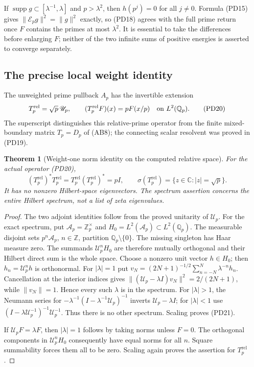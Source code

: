 \documentclass[11pt,a4paper]{article}
\newtheorem{theorem}{Theorem}[section]
\theoremstyle{definition}\newtheorem{definition}[theorem]{Definition}
\newcommand{\Z}{\mathbb Z}\newcommand{\Q}{\mathbb Q}
\newcommand{\C}{\mathbb C}\newcommand{\R}{\mathbb R}
\newcommand{\supp}{\operatorname{supp}}\newcommand{\tr}{\operatorname{tr}}
\begin{document}
If $\supp g\subset[\lambda^{-1},\lambda]$ and $p>\lambda^2$,
then $h(p^j)=0$ for all $j\ne0$. Formula (PD15) gives
$\|\mathcal E_pg\|^2=\|g\|^2$ exactly, so (PD18) agrees with the
full prime return once $F$ contains the primes at most $\lambda^2$.
It is essential to take the differences before enlarging $F$; neither
of the two infinite sums of positive energies is asserted to converge
separately.

\subsection{The precise local weight identity}
The unweighted prime pullback $A_p$ has the invertible extension
\[
 T_p^{\mathrm{rel}}=\sqrt p\,\mathscr U_p,
 \qquad (T_p^{\mathrm{rel}}F)(x)=pF(x/p)
 \quad\hbox{on }L^2(\Q_p).
 \tag{PD20}
\]
The superscript distinguishes this relative-prime operator from the
finite mixed-boundary matrix $T_p=D_p$ of (AB8); the connecting scalar
resolvent was proved in (PD19).

\begin{theorem}[Weight-one norm identity on the computed relative space]
\label{thm:PD-local-weight}
For the actual operator (PD20),
\[
 (T_p^{\mathrm{rel}})^*T_p^{\mathrm{rel}}
 =T_p^{\mathrm{rel}}(T_p^{\mathrm{rel}})^*=pI,
 \qquad \sigma(T_p^{\mathrm{rel}})=\{z\in\C:|z|=\sqrt p\}.
 \tag{PD21}
\]
It has no nonzero Hilbert-space eigenvectors. The spectrum assertion
concerns the entire Hilbert spectrum, not a list of zeta eigenvalues.
\end{theorem}
\begin{proof}
The two adjoint identities follow from the proved unitarity of $\mathscr U_p$.
For the exact spectrum, put
$\mathcal A_p=\Z_p^\times$ and
$H_0=L^2(\mathcal A_p)\subset L^2(\Q_p)$. The measurable disjoint
sets $p^n\mathcal A_p$, $n\in\Z$, partition $\Q_p\setminus\{0\}$.
The missing singleton has Haar measure zero. The summands
$\mathscr U_p^nH_0$ are therefore mutually orthogonal and their Hilbert direct
sum is the whole space. Choose a nonzero unit vector $h\in H_0$;
then $h_n=\mathscr U_p^nh$ is orthonormal. For $|\lambda|=1$ put
$v_N=(2N+1)^{-1/2}\sum_{n=-N}^N\lambda^{-n}h_n$.
Cancellation at the interior indices gives
$\|(\mathscr U_p-\lambda I)v_N\|^2=2/(2N+1)$, while $\|v_N\|=1$.
Hence every such $\lambda$ is in the spectrum. For $|\lambda|>1$,
the Neumann series for $-\lambda^{-1}(I-\lambda^{-1}\mathscr U_p)^{-1}$
inverts $\mathscr U_p-\lambda I$; for $|\lambda|<1$ use
$(I-\lambda \mathscr U_p^{-1})^{-1}\mathscr U_p^{-1}$. Thus there is no other spectrum.
Scaling proves (PD21).

If $\mathscr U_pF=\lambda F$, then $|\lambda|=1$ follows by taking norms
unless $F=0$. The orthogonal components in $\mathscr U_p^nH_0$ consequently
have equal norms for all $n$. Square summability forces them all to
be zero. Scaling again proves the assertion for $T_p^{\mathrm{rel}}$.
\end{proof}
\end{document}
